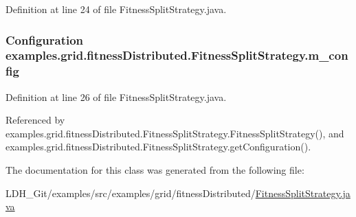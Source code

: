 Definition at line 24 of file Fitness\-Split\-Strategy.\-java.

\hypertarget{classexamples_1_1grid_1_1fitness_distributed_1_1_fitness_split_strategy_add13c598e60b5dc93d48568dc6ba406e}{
\subsubsection[{m\-\_\-config}]{\setlength{\rightskip}{0pt plus 5cm}Configuration examples.\-grid.\-fitness\-Distributed.\-Fitness\-Split\-Strategy.\-m\-\_\-config\hspace{0.3cm}{\ttfamily [private]}}}\label{classexamples_1_1grid_1_1fitness_distributed_1_1_fitness_split_strategy_add13c598e60b5dc93d48568dc6ba406e}


Definition at line 26 of file Fitness\-Split\-Strategy.\-java.



Referenced by examples.\-grid.\-fitness\-Distributed.\-Fitness\-Split\-Strategy.\-Fitness\-Split\-Strategy(), and examples.\-grid.\-fitness\-Distributed.\-Fitness\-Split\-Strategy.\-get\-Configuration().



The documentation for this class was generated from the following file\-:\begin{DoxyCompactItemize}
\item 
L\-D\-H\-\_\-\-Git/examples/src/examples/grid/fitness\-Distributed/\hyperlink{_fitness_split_strategy_8java}{Fitness\-Split\-Strategy.\-java}\end{DoxyCompactItemize}
